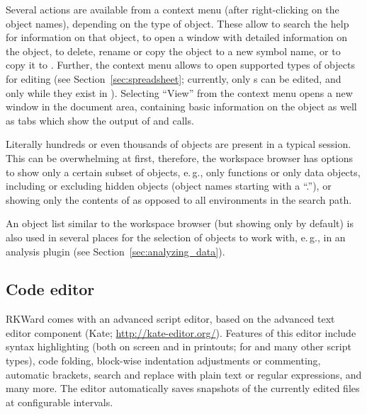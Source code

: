 Several actions are available from a context menu (after right-clicking
on the object names), depending on the type of object. These allow to search the
 help for information on that object, to
open a window with detailed information on the object, to delete, rename or copy the object to a new symbol name, or to
copy it to . Further, the context menu allows to open
supported types of objects for editing (see Section~\ref{sec:spreadsheet}; currently, only
s can be edited, and only while they exist in ). 
Selecting ``View'' from the 
context menu opens a new window in the
document area, containing basic information on the object as well as 
tabs which show the output of
 and  calls.

Literally hundreds or even thousands of objects are present in a typical
 session. This can be overwhelming at
first, therefore, the workspace browser has options to show only a certain
subset of objects, e.\,g., only functions or only data objects, including
or excluding hidden objects (object names starting with a 
``.''), or showing only the contents of  as
opposed to all environments in the search path.

An object list similar to the workspace browser (but showing only 
 by default) is also used in several places for the
selection of objects to work with, e.\,g., in an analysis plugin (see Section~\ref{sec:analyzing_data}).


\subsection{Code editor}
\label{sec:code_editor}

RKWard comes with an advanced
 script editor, based on the
 advanced text editor component (Kate; \url{http://kate-editor.org/}). Features of this
editor include syntax highlighting (both on screen and in printouts; for
 and many other script types), code
folding, block-wise indentation adjustments or commenting, automatic
brackets, search and replace with plain text or regular expressions,
and many more. The editor automatically saves snapshots of the
currently edited files at configurable intervals.

